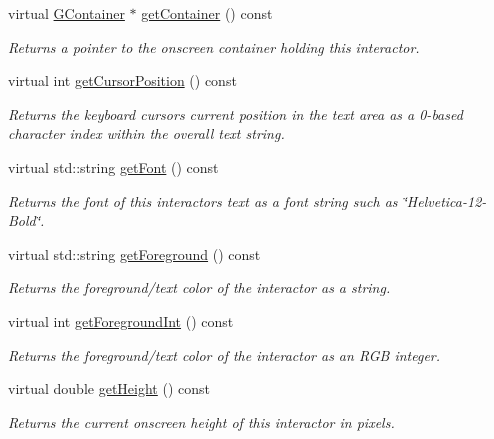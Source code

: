 \begin{DoxyCompactItemize}
virtual \mbox{\hyperlink{classGContainer}{G\+Container}} $\ast$ \mbox{\hyperlink{classGInteractor_a7a6e317c29d61030929b4cd2d1c00fe7}{get\+Container}} () const
\begin{DoxyCompactList}\small\item\em Returns a pointer to the onscreen container holding this interactor. \end{DoxyCompactList}\item 
virtual int \mbox{\hyperlink{classGTextArea_aa85d2267b4534eb372cd3114ea61ba3b}{get\+Cursor\+Position}} () const
\begin{DoxyCompactList}\small\item\em Returns the keyboard cursor\textquotesingle{}s current position in the text area as a 0-\/based character index within the overall text string. \end{DoxyCompactList}\item 
virtual std\+::string \mbox{\hyperlink{classGInteractor_a894a5502900794eeb27d084c21f1d77d}{get\+Font}} () const
\begin{DoxyCompactList}\small\item\em Returns the font of this interactor\textquotesingle{}s text as a font string such as \char`\"{}\+Helvetica-\/12-\/\+Bold\char`\"{}. \end{DoxyCompactList}\item 
virtual std\+::string \mbox{\hyperlink{classGInteractor_a4fa2d8b0192a3a5b4af4bbfe71194d03}{get\+Foreground}} () const
\begin{DoxyCompactList}\small\item\em Returns the foreground/text color of the interactor as a string. \end{DoxyCompactList}\item 
virtual int \mbox{\hyperlink{classGInteractor_ac3b12ab385a6ef9ae90fc879860ba726}{get\+Foreground\+Int}} () const
\begin{DoxyCompactList}\small\item\em Returns the foreground/text color of the interactor as an R\+GB integer. \end{DoxyCompactList}\item 
virtual double \mbox{\hyperlink{classGInteractor_a1e7e353362434072875264cf95629f99}{get\+Height}} () const
\begin{DoxyCompactList}\small\item\em Returns the current onscreen height of this interactor in pixels. \end{DoxyCompactList}\item 

\end{DoxyCompactItemize}
